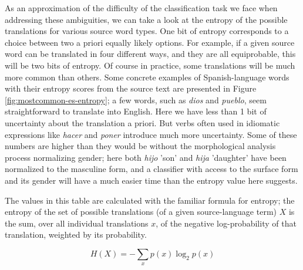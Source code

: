 As an approximation of the difficulty of the classification task we face when
addressing these ambiguities, we can take a look at the entropy of the possible
translations for various source word types.
One bit of entropy corresponds to a choice between two a priori equally likely
options. For example, if a given source word can be translated in four
different ways, and they are all equiprobable, this will be two bits of entropy.
Of course in practice, some translations will be much more common than others.
Some concrete examples of Spanish-language words with their entropy scores from
the source text are presented in Figure \ref{fig:mostcommon-es-entropy};
a few words, such as \emph{dios} and \emph{pueblo}, seem straightforward to
translate into English. Here we have less than 1 bit of uncertainty about the
translation a priori. But verbs often used in idiomatic expressions like
\emph{hacer} and \emph{poner} introduce much more uncertainty. Some of these
numbers are higher than they would be without the morphological
analysis process normalizing gender; here both \emph{hijo} 'son' and
\emph{hija} 'daughter' have been normalized to the masculine form, and a
classifier with access to the surface form and its gender will have a much
easier time than the entropy value here suggests.

The values in this table are calculated with the familiar formula for entropy;
the entropy of the set of possible translations (of a given source-language
term) $X$ is the sum, over all individual translations $x$, of the negative
log-probability of that translation, weighted by its probability.

$$
  H(X) = -\displaystyle\sum_{x} p(x)\log_{2}{p(x)}
$$


